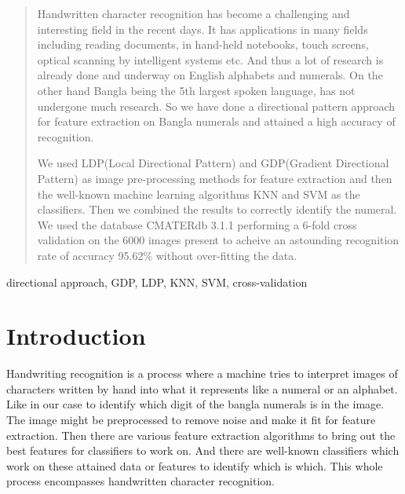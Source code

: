 \documentclass[conference]{IEEEtran}
\begin{document}
\begin{abstract}
Handwritten character recognition has become a challenging and interesting field in the recent days. It has applications in many fields including reading documents, in hand-held notebooks, touch screens, optical scanning by intelligent systems etc. And thus a lot of research is already done and underway on English alphabets and numerals. On the other hand Bangla being the 5th largest spoken language, has not undergone much research. So we have done a directional pattern approach for feature extraction on Bangla numerals and attained a high accuracy of recognition.

We used LDP(Local Directional Pattern) and GDP(Gradient Directional Pattern) as image pre-processing methods for feature extraction and then the well-known machine learning algorithms KNN and SVM as the classifiers. Then we combined the results to correctly identify the numeral. We used the database CMATERdb 3.1.1 performing a 6-fold cross validation on the 6000 images present to acheive an astounding recognition rate of accuracy 95.62\% without over-fitting the data.
\end{abstract}

\begin{IEEEkeywords}
directional approach, GDP, LDP, KNN, SVM, cross-validation
\end{IEEEkeywords}






%
\IEEEpeerreviewmaketitle



\section{Introduction}
Handwriting recognition is a process where a machine tries to interpret images of characters written by hand into what it represents like a numeral or an alphabet. Like in our case to identify which digit of the bangla numerals is in the image. The image might be preprocessed to remove noise and make it fit for feature extraction. Then there are various feature extraction algorithms to bring out the best features for classifiers to work on. And there are well-known classifiers which work on these attained data or features to identify which is which. This whole process encompasses handwritten character recognition.
\end{document}
